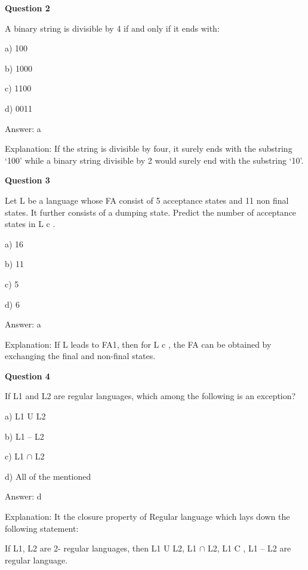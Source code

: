 \documentclass{article}
\begin{document}
\begin{mdframed}[linewidth=1pt, roundcorner=5pt, linecolor=gray!30, backgroundcolor=gray!5]
\textbf{Question 2} 

A binary string is divisible by 4 if and only if it ends with:

a) 100

b) 1000

c) 1100

d) 0011
\vspace{5pt} \par
\begin{tcolorbox}[colback=green!5, colframe=green!40!black, title=Solution]
Answer: a

Explanation: If the string is divisible by four, it surely ends with the substring ‘100' while a binary string divisible by 2 would surely end with the substring ‘10'.
\end{tcolorbox}
\end{mdframed}

\begin{mdframed}[linewidth=1pt, roundcorner=5pt, linecolor=gray!30, backgroundcolor=gray!5]
\textbf{Question 3} 

Let L be a language whose FA consist of 5 acceptance states and 11 non final states. It further consists of a dumping state. Predict the number of acceptance states in L
c
.

a) 16

b) 11

c) 5

d) 6
\vspace{5pt} \par
\begin{tcolorbox}[colback=green!5, colframe=green!40!black, title=Solution]
Answer: a

Explanation: If L leads to FA1, then for L
c
, the FA can be obtained by exchanging the final and non-final states.
\end{tcolorbox}
\end{mdframed}
\newpage

\begin{mdframed}[linewidth=1pt, roundcorner=5pt, linecolor=gray!30, backgroundcolor=gray!5]
\textbf{Question 4} 

If L1 and L2 are regular languages, which among the following is an exception?

a) L1 U L2

b) L1 – L2

c) L1 $\cap$ L2

d) All of the mentioned
\vspace{5pt} \par
\begin{tcolorbox}[colback=green!5, colframe=green!40!black, title=Solution]
Answer: d

Explanation: It the closure property of Regular language which lays down the following statement:

If L1, L2 are 2- regular languages, then L1 U L2, L1 $\cap$ L2, L1
C
, L1 – L2 are regular language.
\end{tcolorbox}
\end{mdframed}
\end{document}
